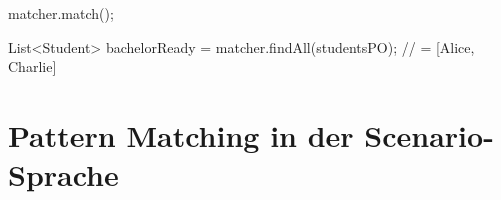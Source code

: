 \begin{jcodeblock}
    matcher.match();

    List<Student> bachelorReady = matcher.findAll(studentsPO);
    // = [Alice, Charlie]
\end{jcodeblock}


\section{Pattern Matching in der Scenario-Sprache}\label{sec:scenario-pattern-matching}

